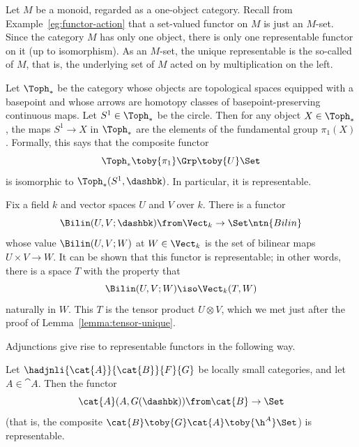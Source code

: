 \begin{example}
Let $M$ be a monoid, regarded as a one-object%
%
%
category.  Recall from Example~\ref{eg:functor-action} that a set-valued
functor on $M$ is just an $M$-set.  Since the category $M$ has only one
object, there is only one representable functor on it (up to isomorphism).
As an $M$-set, the unique representable is the so-called  of $M$, that is, the underlying set of $M$ acted on by
multiplication on the left.
\end{example}

\begin{example}
Let $\Toph_*$%
%
%
be the category whose objects are topological spa\-ces equipped with a
basepoint and whose arrows are homotopy%
%
%
classes of basepoint-preserving continuous maps.  Let $S^1 \in \Toph_*$%
%
% 
be the circle.  Then for any object $X \in \Toph_*$, the maps $S^1 \to X$
in $\Toph_*$ are the elements of the fundamental%
%
%
group $\pi_1(X)$.  Formally, this says that the composite functor
\[
\Toph_* \toby{\pi_1} \Grp \toby{U} \Set
\]
is isomorphic to $\Toph_*(S^1, \dashbk)$.  In particular, it is
representable.
\end{example}

\begin{example}
\label{eg:co-reps-tensor}
Fix a field $k$ and vector spaces $U$ and $V$ over $k$.  There is a
functor 
\[
\Bilin(U, V; \dashbk)\from \Vect_k \to \Set%
%
\index{map!bilinear}
%
\ntn{Bilin}
%
\]
whose value $\Bilin(U, V; W)$ at $W \in \Vect_k$ is the set of bilinear
maps $U \times V \to W$.  It can be shown that this functor is
representable; in other words, there is a space $T$ with the property that
\[
\Bilin(U, V; W) \iso \Vect_k(T, W)
\]
naturally in $W$.  This $T$ is the tensor%
%
%
product $U \otimes V$, which we met just after the proof of
Lemma~\ref{lemma:tensor-unique}.
\end{example}

Adjunctions give rise to representable%
%
%
functors in the following way.

\begin{lemma}
\label{lemma:adj-to-rep}
Let $\hadjnli{\cat{A}}{\cat{B}}{F}{G}$ be locally small categories, and let
$A \in \cat{A}$.  Then the functor
\[
\cat{A}(A, G(\dashbk))\from \cat{B} \to \Set
\]
(that is, the composite $\cat{B} \toby{G} \cat{A} \toby{\h^A} \Set$) is
representable.  
\end{lemma}

